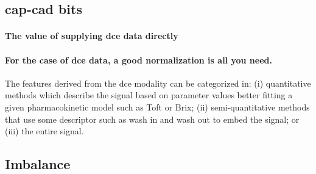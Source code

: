 \documentclass[a4paper,num-refs]{wiley-article}
\begin{document}
\subsection{\ac{cap}-\ac{cad} bits}
\label{sec:experiments:mpmri-comparison}
\paragraph{The value of supplying \ac{dce} data directly}
\paragraph{For the case of \ac{dce} data, a good normalization is all you need.}

The features derived from the \ac{dce} modality can be categorized in: 
(i) quantitative methods which describe the signal based on parameter values
better fitting a given pharmacokinetic model such as Toft or Brix;
(ii) semi-quantitative methods that use some descriptor such as wash in and wash
out to embed the signal;
or (iii) the entire signal.

%


\subsection{Imbalance}
\label{sec:experiments:imbalance}
\end{document}
